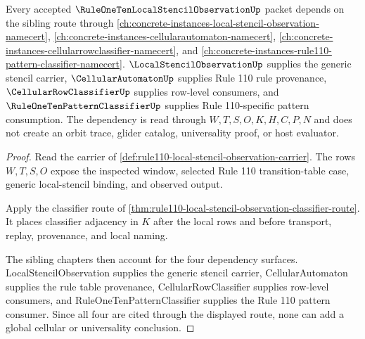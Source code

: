 \begin{theorem}
\label{thm:rule110-local-stencil-observation-sibling-dependency}
Every accepted $\RuleOneTenLocalStencilObservationUp$ packet depends on the sibling route through \autoref{ch:concrete-instances-local-stencil-observation-namecert}, \autoref{ch:concrete-instances-cellularautomaton-namecert}, \autoref{ch:concrete-instances-cellularrowclassifier-namecert}, and \autoref{ch:concrete-instances-rule110-pattern-classifier-namecert}. $\LocalStencilObservationUp$ supplies the generic stencil carrier, $\CellularAutomatonUp$ supplies Rule 110 rule provenance, $\CellularRowClassifierUp$ supplies row-level consumers, and $\RuleOneTenPatternClassifierUp$ supplies Rule 110-specific pattern consumption. The dependency is read through $W,T,S,O,K,H,C,P,N$ and does not create an orbit trace, glider catalog, universality proof, or host evaluator.
\end{theorem}
\begin{proof}
Read the carrier of \autoref{def:rule110-local-stencil-observation-carrier}. The rows $W,T,S,O$ expose the inspected window, selected Rule 110 transition-table case, generic local-stencil binding, and observed output.

Apply the classifier route of \autoref{thm:rule110-local-stencil-observation-classifier-route}. It places classifier adjacency in $K$ after the local rows and before transport, replay, provenance, and local naming.

The sibling chapters then account for the four dependency surfaces. LocalStencilObservation supplies the generic stencil carrier, CellularAutomaton supplies the rule table provenance, CellularRowClassifier supplies row-level consumers, and RuleOneTenPatternClassifier supplies the Rule 110 pattern consumer. Since all four are cited through the displayed route, none can add a global cellular or universality conclusion.
\end{proof}



